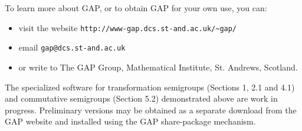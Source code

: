 \documentclass[12pt]{article}
\theoremstyle{plain} \newtheorem{Thm}{Theorem}
\theoremstyle{plain} \newtheorem{Cor}{Corollary}
\theoremstyle{plain} \newtheorem{Lemma}{Lemma}
\theoremstyle{plain} \newtheorem{Prop}{Proposition}
\theoremstyle{plain} \newtheorem{Ex}{Exercise}
\def\gap{\sf GAP}
\begin{document}
To learn more about {\gap}, or to obtain {\gap} for your
own use,  you can:
\begin{itemize}
\item visit the website {\tt http://www-gap.dcs.st-and.ac.uk/\~{}gap/}
\item email  {\tt gap@dcs.st-and.ac.uk}
\item or write to The {\gap} Group, Mathematical Institute, 
St. Andrews, Scotland.
\end{itemize}

The specialized software for transformation semigroups (Sections 1, 2.1
and 4.1) and commutative semigroups (Section 5.2) demonstrated 
above are work in progress.
Preliminary versions may be obtained as a separate download
from the {\gap} website and installed using the {\gap} share-package
mechanism.




\end{document}
